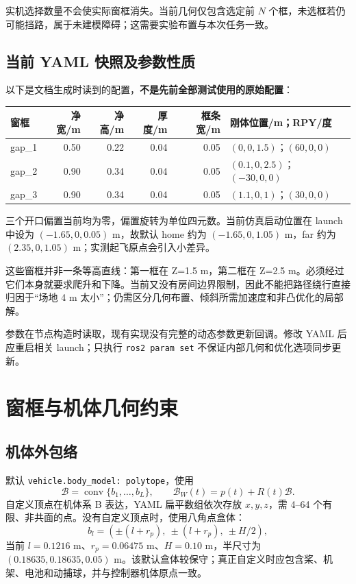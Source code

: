 \documentclass[UTF8,fontset=fandol,a4paper,10pt]{ctexart}
\newcommand{\code}[1]{{\small\nolinkurl{#1}}}
\begin{document}
实机选择数量不会使实际窗框消失。当前几何仅包含选定前 $N$ 个框，未选框若仍可能挡路，属于未建模障碍；这需要实验布置与本次任务一致。

\subsection{当前 YAML 快照及参数性质}
以下是文档生成时读到的配置，\textbf{不是先前全部测试使用的原始配置}：
\begin{center}
\begin{tabular}{@{}lrrrrl@{}}\toprule
窗框 & 净宽/m & 净高/m & 厚度/m & 框条宽/m & 刚体位置/m；RPY/度\\\midrule
gap\_1 & 0.50 & 0.22 & 0.04 & 0.05 & $(0,0,1.5)$；$(60,0,0)$\\
gap\_2 & 0.90 & 0.34 & 0.04 & 0.05 & $(0.1,0,2.5)$；$(-30,0,0)$\\
gap\_3 & 0.90 & 0.34 & 0.04 & 0.05 & $(1.1,0,1)$；$(30,0,0)$\\\bottomrule
\end{tabular}
\end{center}
三个开口偏置当前均为零，偏置旋转为单位四元数。当前仿真启动位置在 launch 中设为 $(-1.65,0,0.05)$ m，故默认 home 约为 $(-1.65,0,1.05)$ m，far 约为 $(2.35,0,1.05)$ m；实测起飞原点会引入小差异。

这些窗框并非一条等高直线：第一框在 Z=1.5 m，第二框在 Z=2.5 m。必须经过它们本身就要求爬升和下降。当前又没有房间边界限制，因此不能把路径绕行直接归因于“场地 4 m 太小”；仍需区分几何布置、倾斜所需加速度和非凸优化的局部解。

参数在节点构造时读取，现有实现没有完整的动态参数更新回调。修改 YAML 后应重启相关 launch；只执行 \code{ros2 param set} 不保证内部几何和优化选项同步更新。

\section{窗框与机体几何约束}
\subsection{机体外包络}
默认 \code{vehicle.body_model: polytope}，使用
\[
 \mathcal B=\operatorname{conv}\{b_1,\ldots,b_L\},\qquad
 \mathcal B_W(t)=p(t)+R(t)\mathcal B.
\]
自定义顶点在机体系 B 表达，YAML 扁平数组依次存放 $x,y,z$，需 4--64 个有限、非共面的点。没有自定义顶点时，使用八角点盒体：
\[
 b_l=(\pm(l+r_p),\ \pm(l+r_p),\ \pm H/2),
\]
当前 $l=0.1216$ m、$r_p=0.06475$ m、$H=0.10$ m，半尺寸为 $(0.18635,0.18635,0.05)$ m。该默认盒体较保守；真正自定义时应包含桨、机架、电池和动捕球，并与控制器机体原点一致。
\end{document}
